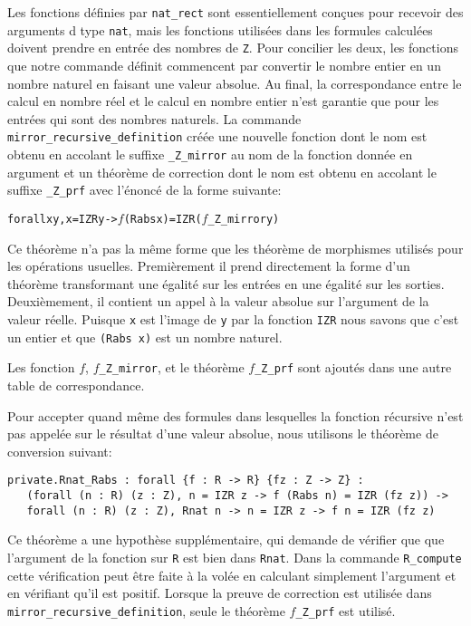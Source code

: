 \documentclass{modjflart}
\begin{document}
Les fonctions définies par \texttt{nat\_rect} sont essentiellement
conçues pour recevoir des arguments d type \texttt{nat}, mais les
fonctions utilisées dans les formules calculées doivent prendre en
entrée des nombres de \texttt{Z}.  Pour concilier les deux, les fonctions
que notre commande définit commencent par convertir le nombre entier en
un nombre naturel en faisant une valeur absolue.  Au
final, la correspondance entre le calcul en nombre réel et le
calcul en nombre entier n'est garantie que pour les entrées qui sont
des nombres naturels.
La commande \texttt{mirror\_recursive\_definition} créée une nouvelle
fonction dont le nom est obtenu en accolant le suffixe
\texttt{\_Z\_mirror} au nom de la fonction donnée en argument et un théorème
de correction dont le nom est obtenu en accolant le suffixe
\texttt{\_Z\_prf} avec l'énoncé de la forme suivante:
\begin{alltt}
forall x y, x = IZR y -> \(f\) (Rabs x) = IZR (\(f\)_Z_mirror y)
\end{alltt}

Ce théorème n'a pas la même forme que les théorème de morphismes
utilisés pour les opérations usuelles.  Premièrement il prend
directement la forme d'un théorème transformant une égalité sur les
entrées en une égalité sur les sorties.  Deuxièmement, il contient
un appel à la valeur absolue sur l'argument de la valeur réelle.
Puisque \texttt{x} est l'image de \texttt{y} par la fonction \texttt{IZR} nous
savons que c'est un entier et que \texttt{(Rabs x)} est un nombre
naturel.

Les fonction \texttt{\(f\)}, \texttt{\(f\)\_Z\_mirror}, et le théorème
\texttt{\(f\)\_Z\_prf} sont ajoutés dans une autre table de
correspondance.

Pour accepter quand même des formules dans lesquelles la fonction
récursive n'est pas appelée sur le résultat d'une valeur absolue, nous
utilisons le théorème de conversion suivant:
\begin{verbatim}
private.Rnat_Rabs : forall {f : R -> R} {fz : Z -> Z} :
   (forall (n : R) (z : Z), n = IZR z -> f (Rabs n) = IZR (fz z)) ->
   forall (n : R) (z : Z), Rnat n -> n = IZR z -> f n = IZR (fz z)
\end{verbatim}
Ce théorème a une hypothèse supplémentaire, qui demande de vérifier
que que l'argument de la fonction sur \texttt{R} est bien dans
\texttt{Rnat}.  Dans la commande \texttt{R\_compute} cette vérification peut
être faite à la volée en calculant simplement l'argument et en vérifiant
qu'il est positif.  Lorsque la preuve de correction est utilisée dans
\texttt{mirror\_recursive\_definition}, seule le théorème
{\(f\)\texttt{\_Z\_prf}} est utilisé.
\end{document}
